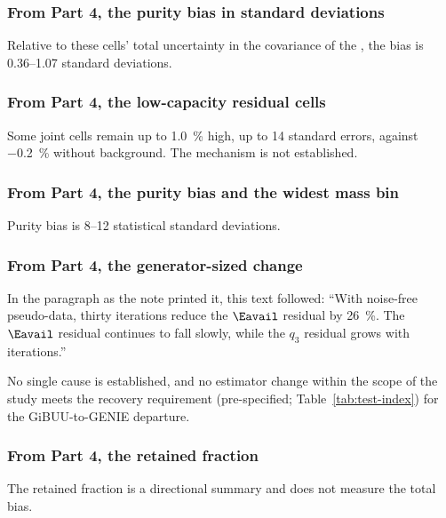 \subsubsection{From Part 4, the purity bias in standard deviations}
Relative to these cells' total uncertainty in the covariance of the \resFiveAxis{}, the bias is 0.36--1.07 standard deviations.

\subsubsection{From Part 4, the low-capacity residual cells}
Some joint cells remain up to \SI{1.0}{\percent} high, up to 14 standard errors, against \SI{-0.2}{\percent} without background. The mechanism is not established.

\subsubsection{From Part 4, the purity bias and the widest mass bin}
Purity bias is 8--12 statistical standard deviations.

\subsubsection{From Part 4, the generator-sized change}
In the paragraph as the note printed it, this text followed: ``With noise-free pseudo-data, thirty iterations reduce the $\Eavail$ residual by \SI{26}{\percent}. The $\Eavail$ residual continues to fall slowly, while the $q_3$ residual grows with iterations.''\par
No single cause is established, and no estimator change within the scope of the study meets the recovery requirement (pre-specified; Table~\ref{tab:test-index}) for the GiBUU-to-GENIE departure.

\subsubsection{From Part 4, the retained fraction}
The retained fraction is a directional summary and does not measure the total bias.

